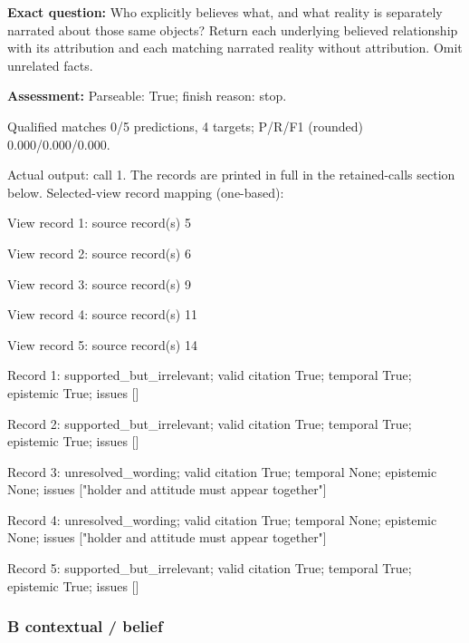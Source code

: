 \noindent\textbf{Exact question:} Who explicitly believes what, and what reality is separately narrated about those same objects? Return each underlying believed relationship with its attribution and each matching narrated reality without attribution. Omit unrelated facts.\par

\noindent\textbf{Assessment:} Parseable: True; finish reason: stop.

Qualified matches 0/5 predictions, 4 targets; P/R/F1 (rounded) 0.000/0.000/0.000.\par

Actual output: call 1. The records are printed in full in the retained-calls section below. Selected-view record mapping (one-based):

View record 1: source record(s) 5\par

View record 2: source record(s) 6\par

View record 3: source record(s) 9\par

View record 4: source record(s) 11\par

View record 5: source record(s) 14\par

Record 1: supported\_but\_irrelevant; valid citation True; temporal True; epistemic True; issues []\par

Record 2: supported\_but\_irrelevant; valid citation True; temporal True; epistemic True; issues []\par

Record 3: unresolved\_wording; valid citation True; temporal None; epistemic None; issues ["holder and attitude must appear together"]\par

Record 4: unresolved\_wording; valid citation True; temporal None; epistemic None; issues ["holder and attitude must appear together"]\par

Record 5: supported\_but\_irrelevant; valid citation True; temporal True; epistemic True; issues []\par

\subsubsection*{B contextual / belief}

